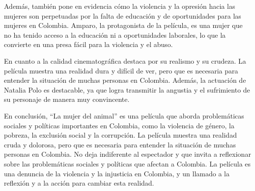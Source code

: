 \documentclass[letterpaper, 12pt]{report}
\begin{document}
Además, también pone en evidencia cómo la violencia y la
opresión hacia las mujeres son perpetuadas por la falta de
educación y de oportunidades para las mujeres en Colombia.
Amparo, la protagonista de la película, es una mujer que no
ha tenido acceso a la educación ni a oportunidades
laborales, lo que la convierte en una presa fácil para la
violencia y el abuso.

En cuanto a la calidad cinematográfica destaca por su
realismo y su crudeza. La película muestra una realidad
dura y difícil de ver, pero que es necesaria para entender
la situación de muchas personas en Colombia. Además, la
actuación de Natalia Polo es destacable, ya que logra
transmitir la angustia y el sufrimiento de su personaje de
manera muy convincente.

En conclusión, ``La mujer del animal'' es una película que
aborda problemáticas sociales y políticas importantes en
Colombia, como la violencia de género, la pobreza, la
exclusión social y la corrupción. La película muestra una
realidad cruda y dolorosa, pero que es necesaria para
entender la situación de muchas personas en Colombia. No
deja indiferente al espectador y que invita a reflexionar
sobre las problemáticas sociales y políticas que afectan a
Colombia. La película es una denuncia de la violencia y la
injusticia en Colombia, y un llamado a la reflexión y a la
acción para cambiar esta realidad.

\newpage

\printbibliography
% 
\end{document}

